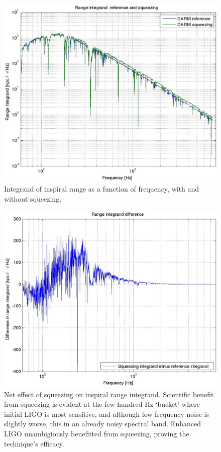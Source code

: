 \begin{figure}
\begin{center}
\includegraphics[height=0.5\paperheight, width=0.5\paperwidth,keepaspectratio]{range_integrand.eps}
\caption{Integrand of inspiral range as a function of frequency, with and without squeezing.}
\end{center}
\end{figure}
\begin{figure}
\begin{center}
\includegraphics[height=0.5\paperheight, width=0.5\paperwidth,keepaspectratio]{range_integrand_difference.eps}
\caption{Net effect of squeezing on inspiral range integrand. Scientific benefit from squeezing is evident at the few hundred Hz `bucket' where initial LIGO is most sensitive, and although low frequency noise is slightly worse, this in an already noisy spectral band. Enhanced LIGO unambigiously benefitted from squeezing, proving the technique's efficacy.
}
\end{center}
\end{figure}




